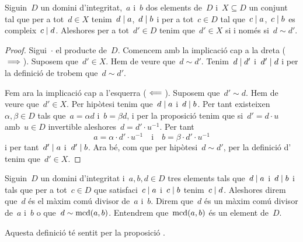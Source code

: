\documentclass[../../main.tex]{subfiles}
\begin{document}
    \begin{proposition}
        \label{prop:màxim comú divisor anells}
        Siguin~\(D\) un domini d'integritat,~\(a\) i~\(b\) dos elements de~\(D\) i~\(X\subseteq D\) un conjunt tal que per a tot~\(d\in X\) tenim~\(d\mathrel{|} a\),~\(d\mathrel{|} b\) i per a tot~\(c\in D\) tal que~\(c\mathrel{|} a\),~\(c\mathrel{|} b\) es compleix~\(c\mathrel{|} d\).
        Aleshores per a tot~\(d'\in D\) tenim que~\(d'\in X\) si i només si~\(d\sim d'\).
        \begin{proof}
            Sigui~\(\cdot\) el producte de~\(D\).
            Comencem amb la implicació cap a la dreta (\(\implies\)).
            Suposem que~\(d'\in X\).
            Hem de veure que~\(d\sim d'\).
            Tenim~\(d\mathrel{|} d'\) i~\(d'\mathrel{|} d\) i per la definició de  trobem que~\(d\sim d'\).

            Fem ara la implicació cap a l'esquerra (\(\impliedby\)).
            Suposem que~\(d'\sim d\).
            Hem de veure que~\(d'\in X\).
            Per hipòtesi tenim que~\(d\mathrel{|} a\) i~\(d\mathrel{|} b\).
            Per tant existeixen~\(\alpha,\beta\in D\) tals que~\(a=\alpha d\) i~\(b=\beta d\), i per la proposició  tenim que si~\(d'=d\cdot u\) amb~\(u\in D\) invertible aleshores~\(d=d'\cdot u^{-1}\).
            Per tant
            \[
                a=\alpha\cdot d'\cdot u^{-1}\quad\text{i}\quad b=\beta\cdot d'\cdot u^{-1}
            \]
            i per tant~\(d'\mathrel{|} a\) i~\(d'\mathrel{|} b\).
            Ara bé, com que per hipòtesi~\(d\sim d'\), per la definició d' tenim que~\(d'\in X\).
        \end{proof}
    \end{proposition}
    \begin{definition}
        \label{def:màxim comú divisor anells}
        \label{def:mcd anells}
        Siguin~\(D\) un domini d'integritat i~\(a,b,d\in D\) tres elements tals que~\(d\mathrel{|} a\) i~\(d\mathrel{|} b\) i tals que per a tot~\(c\in D\) que satisfaci~\(c\mathrel{|} a\) i~\(c\mathrel{|} b\) tenim~\(c\mathrel{|} d\).
        Aleshores direm que~\(d\) és el màxim comú divisor de~\(a\) i~\(b\).
        Direm que~\(d\) és un màxim comú divisor de~\(a\) i~\(b\) o que~\(d\sim\operatorname{mcd}(a,b)\).
        Entendrem que~\(\operatorname{mcd}(a,b)\) és un element de~\(D\).

        Aquesta definició té sentit per la proposició .
    \end{definition}
\end{document}
